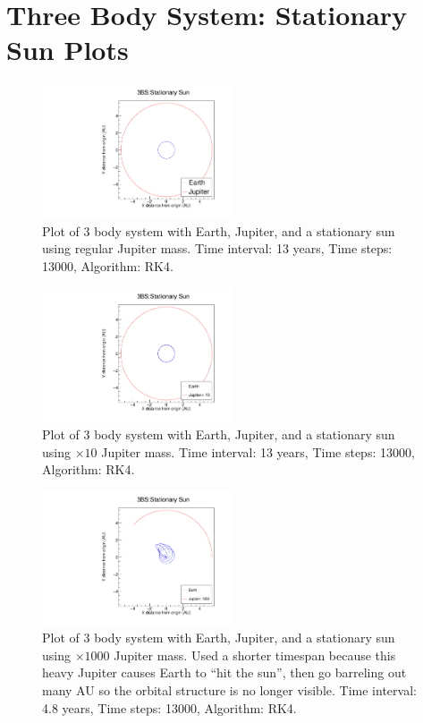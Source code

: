 \documentclass[a4paper,12pt]{report}
\begin{document}
 \chapter{Three Body System: Stationary Sun Plots}\label{app:3bsss}
 
 \begin{figure}[H]
 \centering
   \includegraphics[width=0.5\textwidth]{ESJFRK4_reg.pdf}
  \caption{Plot of 3 body system with Earth, Jupiter, and a stationary sun using regular Jupiter mass. Time interval: 13 years, Time steps: 13000, Algorithm: RK4.}
  \label{fig:ESJFRK4_reg}
 \end{figure}
 
  \begin{figure}[H]
 \centering
   \includegraphics[width=0.5\textwidth]{ESJFRK4_x10.pdf}
  \caption{Plot of 3 body system with Earth, Jupiter, and a stationary sun using $\times 10$ Jupiter mass. Time interval: 13 years, Time steps: 13000, Algorithm: RK4.}
  \label{fig:ESJFRK4_x10}
 \end{figure}
 
  \begin{figure}[H]
 \centering
   \includegraphics[width=0.5\textwidth]{ESJFRK4_x1000.pdf}
  \caption{Plot of 3 body system with Earth, Jupiter, and a stationary sun using $\times 1000$ Jupiter mass. Used a shorter timespan because this heavy Jupiter causes Earth to ``hit the sun'', then go barreling out many AU so the orbital structure is no longer visible. Time interval: 4.8 years, Time steps: 13000, Algorithm: RK4.}
  \label{fig:ESJFRK4_x1000}
 \end{figure}
 
\end{document}

